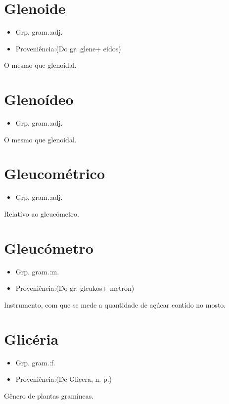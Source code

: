 \section{Glenoide}
\begin{itemize}
\item {Grp. gram.:adj.}
\end{itemize}
\begin{itemize}
\item {Proveniência:(Do gr. \textunderscore glene\textunderscore  + \textunderscore eídos\textunderscore )}
\end{itemize}
O mesmo que \textunderscore glenoidal\textunderscore .
\section{Glenoídeo}
\begin{itemize}
\item {Grp. gram.:adj.}
\end{itemize}
O mesmo que \textunderscore glenoidal\textunderscore .
\section{Gleucométrico}
\begin{itemize}
\item {Grp. gram.:adj.}
\end{itemize}
Relativo ao gleucómetro.
\section{Gleucómetro}
\begin{itemize}
\item {Grp. gram.:m.}
\end{itemize}
\begin{itemize}
\item {Proveniência:(Do gr. \textunderscore gleukos\textunderscore  + \textunderscore metron\textunderscore )}
\end{itemize}
Instrumento, com que se mede a quantidade de açúcar contido no mosto.
\section{Glicéria}
\begin{itemize}
\item {Grp. gram.:f.}
\end{itemize}
\begin{itemize}
\item {Proveniência:(De \textunderscore Glicera\textunderscore , n. p.)}
\end{itemize}
Gênero de plantas gramíneas.
